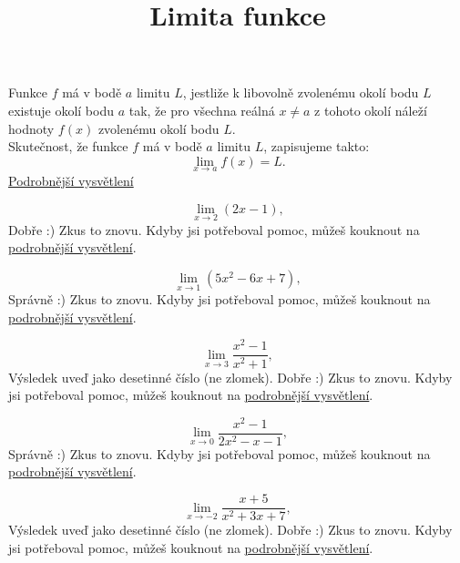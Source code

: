 \documentclass[onepage, language = czech]{webquiz}
\title{Limita funkce}
\begin{document}
	
	\begin{discussion}\label{d1} %
		Funkce $f$ má v bodě $a$ limitu $L$, jestliže k libovolně zvolenému okolí bodu $L$ existuje okolí bodu $a$ tak, že pro všechna reálná $x \neq a$ z tohoto okolí náleží hodnoty $f(x)$ zvolenému okolí bodu $L$.\\
		Skutečnost, že funkce $f$ má v bodě $a$ limitu $L$, zapisujeme takto: \[\lim_{x\to a}f(x)=L.\]
		\href{https://www.youtube.com/watch?v=tSzMZqrAqPc&list=PLD-MTmOzXT5Meh7DoN_gPn3FSFAx-vCnT}{Podrobnější vysvětlení}
	\end{discussion}

	\begin{question} %
		\[\lim_{x\to 2}(2x-1),\]
		\whenRight Dobře :)
		\whenWrong Zkus to znovu. Kdyby jsi potřeboval pomoc, můžeš kouknout na \href{https://www.youtube.com/watch?v=tSzMZqrAqPc&list=PLD-MTmOzXT5Meh7DoN_gPn3FSFAx-vCnT}{podrobnější vysvětlení}.
	\end{question}

	\begin{question} %
		\[\lim_{x\to 1}(5x^2-6x+7),\]
		\whenRight Správně :)
		\whenWrong Zkus to znovu. Kdyby jsi potřeboval pomoc, můžeš kouknout na \href{https://www.youtube.com/watch?v=tSzMZqrAqPc&list=PLD-MTmOzXT5Meh7DoN_gPn3FSFAx-vCnT}{podrobnější vysvětlení}.
	\end{question}

	\begin{question} %
		\[\lim_{x\to 3}\frac{x^2-1}{x^2+1},\]
		Výsledek uveď jako desetinné číslo (ne zlomek).
		\whenRight Dobře :)
		\whenWrong Zkus to znovu. Kdyby jsi potřeboval pomoc, můžeš kouknout na \href{https://www.youtube.com/watch?v=tSzMZqrAqPc&list=PLD-MTmOzXT5Meh7DoN_gPn3FSFAx-vCnT}{podrobnější vysvětlení}.
	\end{question}

	\begin{question} %
		\[\lim_{x\to 0}\frac{x^2-1}{2x^2-x-1},\]
		\whenRight Správně :)
		\whenWrong Zkus to znovu. Kdyby jsi potřeboval pomoc, můžeš kouknout na \href{https://www.youtube.com/watch?v=tSzMZqrAqPc&list=PLD-MTmOzXT5Meh7DoN_gPn3FSFAx-vCnT}{podrobnější vysvětlení}.
	\end{question}

	\begin{question} %
		\[\lim_{x\to -2}\frac{x+5}{x^2+3x+7},\]
		Výsledek uveď jako desetinné číslo (ne zlomek).
		\whenRight Dobře :)
		\whenWrong Zkus to znovu. Kdyby jsi potřeboval pomoc, můžeš kouknout na \href{https://www.youtube.com/watch?v=tSzMZqrAqPc&list=PLD-MTmOzXT5Meh7DoN_gPn3FSFAx-vCnT}{podrobnější vysvětlení}.
	\end{question}
\end{document}
